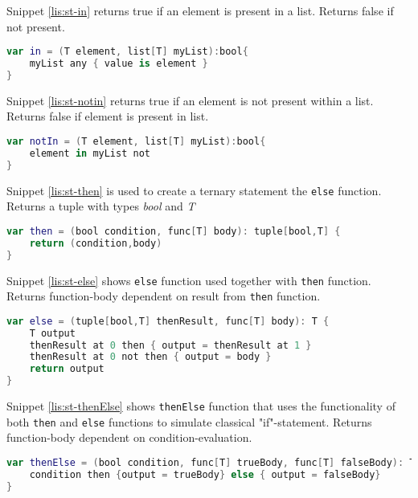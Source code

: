Snippet \ref{lis:st-in} returns true if an element is present in a list. Returns false if not present. 
\begin{lstlisting}[language=Kotlin,label=lis:st-in,caption=\texttt{in} function.]
var in = (T element, list[T] myList):bool{
	myList any { value is element }
}
\end{lstlisting}

Snippet \ref{lis:st-notin} returns true if an element is not present within a list. Returns false if element is present in list. 
\begin{lstlisting}[language=Kotlin,label=lis:st-notin,caption=\texttt{notIn} function.]
var notIn = (T element, list[T] myList):bool{
	element in myList not
}
\end{lstlisting}

Snippet \ref{lis:st-then} is used to create a ternary statement the \texttt{else} function. Returns a tuple with types \textit{bool} and \textit{T}
\begin{lstlisting}[language=Kotlin,label=lis:st-then,caption=\texttt{then} function.]
var then = (bool condition, func[T] body): tuple[bool,T] {
	return (condition,body)
}
\end{lstlisting}

Snippet \ref{lis:st-else} shows \texttt{else} function used together with \texttt{then} function. Returns function-body dependent on result from \texttt{then} function.
\begin{lstlisting}[language=Kotlin,label=lis:st-else,caption=\texttt{else} function.]
var else = (tuple[bool,T] thenResult, func[T] body): T {
	T output
	thenResult at 0 then { output = thenResult at 1 }
	thenResult at 0 not then { output = body }
	return output
}
\end{lstlisting}

Snippet \ref{lis:st-thenElse} shows \texttt{thenElse} function that uses the functionality of both \texttt{then} and \texttt{else} functions to simulate classical "if"-statement. Returns function-body dependent on condition-evaluation. 
\begin{lstlisting}[language=Kotlin,label=lis:st-thenElse,caption=\texttt{thenElse} function.]
var thenElse = (bool condition, func[T] trueBody, func[T] falseBody): T {
	condition then {output = trueBody} else { output = falseBody}
}
\end{lstlisting}
